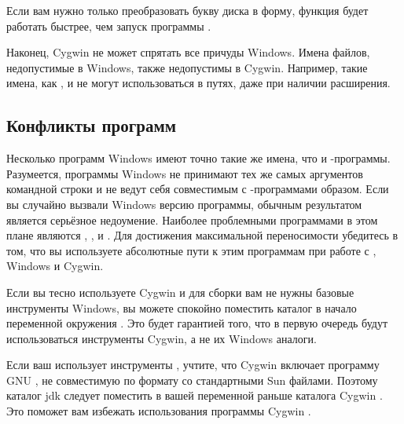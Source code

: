 Если вам нужно только преобразовать букву диска в \POSIX{} форму,
функция  будет работать быстрее, чем
запуск программы .

Наконец, Cygwin не может спрятать все причуды Windows. Имена файлов,
недопустимые в Windows, также недопустимы в Cygwin. Например, такие
имена, как ,  и  не могут
использоваться в \POSIX{} путях, даже при наличии расширения.

\subsection*{Конфликты программ}

Несколько программ Windows имеют точно такие же имена, что и
\UNIX{}-программы. Разумеется, программы Windows не принимают тех же
самых аргументов командной строки и не ведут себя совместимым с
\UNIX{}-программами образом. Если вы случайно вызвали Windows версию
программы, обычным результатом является серьёзное недоумение. Наиболее
проблемными программами в этом плане являются ,
,  и . Для достижения
максимальной переносимости убедитесь в том, что вы используете
абсолютные пути к этим программам при работе с \UNIX{}, Windows
и Cygwin.

Если вы тесно используете Cygwin и для сборки вам не нужны базовые
инструменты Windows, вы можете спокойно поместить каталог
 в начало переменной окружения . Это
будет гарантией того, что в первую очередь будут использоваться
инструменты Cygwin, а не их Windows аналоги.

Если ваш \Makefile{} использует инструменты \Java{}, учтите, что
Cygwin включает программу GNU , не совместимую по формату
со стандартными Sun  файлами. Поэтому каталог \Java{}
jdk  следует поместить в вашей переменной
 раньше каталога Cygwin . Это поможет
вам избежать использования программы Cygwin .
